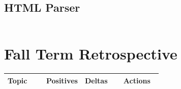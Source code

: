 \documentclass[letterpaper,10pt,titlepage,draftclsnofoot,onecolumn,onesided] {IEEEtran}
\begin{document}
	\subsection{HTML Parser}
	\begin{lstlisting}

	\end{lstlisting}
	
\pagebreak
\section{Fall Term Retrospective}
	\begin{center}
	\begin{singlespace}
		\begin{tabular}{ |  p{0.25\linewidth}  |  p{0.25\linewidth}  | p{0.25\linewidth} | p{0.25\linewidth} |}
		\hline
		Topic & Positives & Deltas & Actions \\ \hline
		

\end{tabular}
\end{singlespace}
\end{center}
\end{document}
